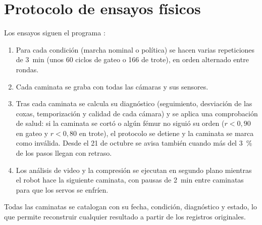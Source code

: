 \section{Protocolo de ensayos físicos}
\label{sec:protocolo-fisico}

Los ensayos siguen el programa :
\begin{enumerate}
    \item Para cada condición (marcha nominal o política) se hacen varias
    repeticiones de 3~min (unos 60 ciclos de gateo o 166 de trote), en orden
    alternado entre rondas.
    \item Cada caminata se graba con todas las cámaras y sus sensores.
    \item Tras cada caminata se calcula su diagnóstico (seguimiento, desviación
    de las coxas, temporización y calidad de cada cámara) y se aplica una
    comprobación de salud: si la caminata se cortó o algún fémur no siguió su
    orden ($r<0{,}90$ en gateo y $r<0{,}80$ en trote), el protocolo se detiene y
    la caminata se marca como inválida. Desde el 21 de octubre se avisa también
    cuando más del 3~\% de los pasos llegan con retraso.
    \item Los análisis de video y la compresión se ejecutan en segundo plano
    mientras el robot hace la siguiente caminata, con pausas de 2~min entre
    caminatas para que los servos se enfríen.
\end{enumerate}
Todas las caminatas se catalogan con su fecha, condición, diagnóstico y estado,
lo que permite reconstruir cualquier resultado a partir de los registros
originales.
